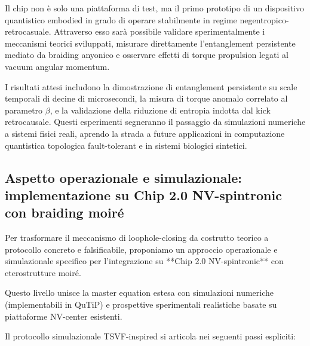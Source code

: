 \documentclass[11pt,a4paper]{article}
\theoremstyle{plain}
\theoremstyle{definition}
\begin{document}
Il chip non è solo una piattaforma di test, ma il primo prototipo di un dispositivo quantistico embodied in grado di operare stabilmente in regime negentropico-retrocasuale. Attraverso esso sarà possibile validare sperimentalmente i meccanismi teorici sviluppati, misurare direttamente l’entanglement persistente mediato da braiding anyonico e osservare effetti di torque propulsion legati al vacuum angular momentum.

I risultati attesi includono la dimostrazione di entanglement persistente su scale temporali di decine di microsecondi, la misura di torque anomalo correlato al parametro $\beta$, e la validazione della riduzione di entropia indotta dal kick retrocausale. Questi esperimenti segneranno il passaggio da simulazioni numeriche a sistemi fisici reali, aprendo la strada a future applicazioni in computazione quantistica topologica fault-tolerant e in sistemi biologici sintetici.


\vspace{0.4cm}


\subsection{Aspetto operazionale e simulazionale: implementazione su Chip 2.0 NV-spintronic con braiding moiré}

\vspace{0.2cm}

Per trasformare il meccanismo di loophole-closing da costrutto teorico a protocollo concreto e falsificabile, proponiamo un approccio operazionale e simulazionale specifico per l'integrazione su **Chip 2.0 NV-spintronic** con eterostrutture moiré.


\vspace{0.3cm}



Questo livello unisce la master equation estesa con simulazioni numeriche (implementabili in QuTiP) e prospettive sperimentali realistiche basate su piattaforme NV-center esistenti.

\vspace{0.2cm}

Il protocollo simulazionale TSVF-inspired si articola nei seguenti passi espliciti:

\vspace{0.2cm}
\end{document}
